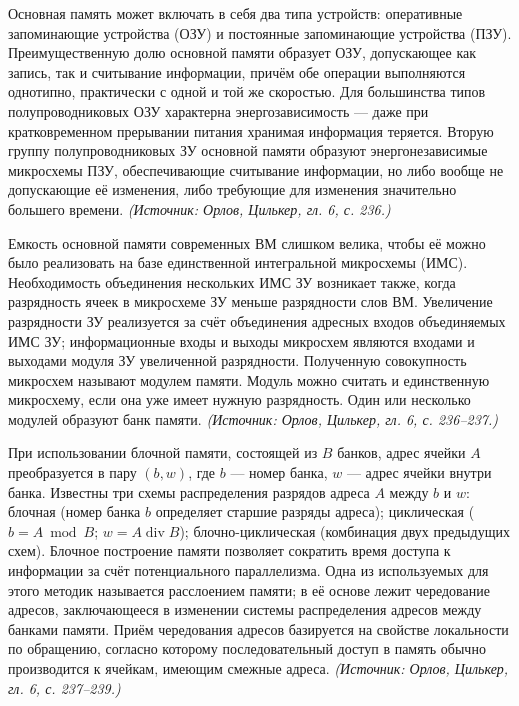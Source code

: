 \documentclass[a4paper,12pt]{article}
\begin{document}
Основная память может включать в себя два типа устройств: оперативные запоминающие устройства (ОЗУ) и постоянные запоминающие устройства (ПЗУ). Преимущественную долю основной памяти образует ОЗУ, допускающее как запись, так и считывание информации, причём обе операции выполняются однотипно, практически с одной и той же скоростью. Для большинства типов полупроводниковых ОЗУ характерна энергозависимость --- даже при кратковременном прерывании питания хранимая информация теряется. Вторую группу полупроводниковых ЗУ основной памяти образуют энергонезависимые микросхемы ПЗУ, обеспечивающие считывание информации, но либо вообще не допускающие её изменения, либо требующие для изменения значительно большего времени.
\textit{(Источник: Орлов, Цилькер, гл. 6, с. 236.)}

Емкость основной памяти современных ВМ слишком велика, чтобы её можно было реализовать на базе единственной интегральной микросхемы (ИМС). Необходимость объединения нескольких ИМС ЗУ возникает также, когда разрядность ячеек в микросхеме ЗУ меньше разрядности слов ВМ. Увеличение разрядности ЗУ реализуется за счёт объединения адресных входов объединяемых ИМС ЗУ; информационные входы и выходы микросхем являются входами и выходами модуля ЗУ увеличенной разрядности. Полученную совокупность микросхем называют модулем памяти. Модуль можно считать и единственную микросхему, если она уже имеет нужную разрядность. Один или несколько модулей образуют банк памяти.
\textit{(Источник: Орлов, Цилькер, гл. 6, с. 236--237.)}

При использовании блочной памяти, состоящей из \(B\) банков, адрес ячейки \(A\) преобразуется в пару \((b,w)\), где \(b\) --- номер банка, \(w\) --- адрес ячейки внутри банка. Известны три схемы распределения разрядов адреса \(A\) между \(b\) и \(w\): блочная (номер банка \(b\) определяет старшие разряды адреса); циклическая (\(b=A\bmod B\); \(w=A\operatorname{div} B\)); блочно-циклическая (комбинация двух предыдущих схем). Блочное построение памяти позволяет сократить время доступа к информации за счёт потенциального параллелизма. Одна из используемых для этого методик называется расслоением памяти; в её основе лежит чередование адресов, заключающееся в изменении системы распределения адресов между банками памяти. Приём чередования адресов базируется на свойстве локальности по обращению, согласно которому последовательный доступ в память обычно производится к ячейкам, имеющим смежные адреса.
\textit{(Источник: Орлов, Цилькер, гл. 6, с. 237--239.)}
\end{document}
